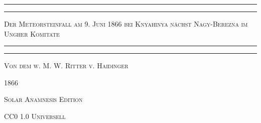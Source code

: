 \documentclass[a4paper, 11pt, oneside, german]{article}
\begin{document}
\begin{titlepage} %
	\centering %

	
	\rule{\textwidth}{1.6pt}\vspace*{-\baselineskip}\vspace*{2pt} %
	\rule{\textwidth}{0.4pt} %
	
	\vspace{1\baselineskip} %
	
	{\scshape\LARGE Der Meteorsteinfall am 9. Juni 1866 bei Knyahinya nächst Nagy-Berezna im Ungher Komitate\\[1.25pt]}
	
	\vspace{1\baselineskip} %

	\rule{\textwidth}{0.4pt}\vspace*{-\baselineskip}\vspace{3.2pt} %
	\rule{\textwidth}{1.6pt} %
	
	\vspace{1\baselineskip} %
	
	
	{\scshape\large Von dem w. M. W. Ritter v. Haidinger} %
	
    \vspace*{\fill}

	\vspace{1\baselineskip}

	{\small\scshape 1866}
		
	\vspace{0.5\baselineskip} %

    {\scshape Solar Anamnesis Edition}  %
	
	{\scshape\small CC0 1.0 Universell} %
\end{titlepage}
\setlength{\parskip}{1mm plus1mm minus1mm}
\clearpage
\tableofcontents
\clearpage
\end{document}

